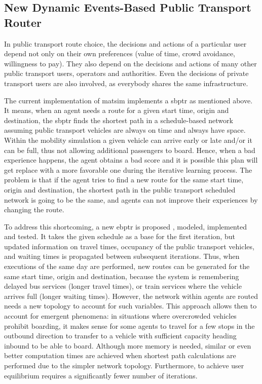 \subsection{New Dynamic Events-Based Public Transport Router}
In public transport route choice, the decisions and actions of a particular user depend not only on their own preferences (value of time, crowd avoidance, willingness to pay). They also depend on the decisions and actions of many other public transport users, operators and authorities. Even the decisions of private transport users are also involved, as everybody shares the same infrastructure.

The current implementation of \gls{matsim} implements a \gls{sbptr} as mentioned above. It means, when an agent needs a route for a given start time, origin and destination, the \gls{sbptr} finds the shortest path in a schedule-based network assuming public transport vehicles are always on time and always have space. Within the mobility simulation a given vehicle can arrive early or late and/or it can be full, thus not allowing additional passengers to board. Hence, when a bad experience happens, the agent obtains a bad score and it is possible this plan will get replace with a more favorable one during the iterative learning process. The problem is that if the agent tries to find a new route for the same start time, origin and destination, the shortest path in the public transport scheduled network is going to be the same, and agents can not improve their experiences by changing the route.

To address this shortcoming, a new \gls{ebptr} is proposed \citep[][]{OrdonezErath_TechRep_FCL_2013}, modeled, implemented and tested. It takes the given schedule as a base for the first iteration, but updated information on travel times, occupancy of the public transport vehicles, and waiting times is propagated between subsequent iterations. Thus, when executions of the same day are performed, new routes can be generated for the same start time, origin and destination, because the system is remembering delayed bus services (longer travel times), or train services where the vehicle arrives full (longer waiting times). However, the network within agents are routed needs a new topology to account for such variables. This approach allows then to account for emergent phenomena: in situations where overcrowded vehicles prohibit boarding, it makes sense for some agents to travel for a few stops in the outbound direction to transfer to a vehicle with sufficient capacity heading inbound to be able to board. Although more memory is needed, similar or even better computation times are achieved when shortest path calculations are performed due to the simpler network topology. Furthermore, to achieve user equilibrium requires a significantly fewer number of iterations.

